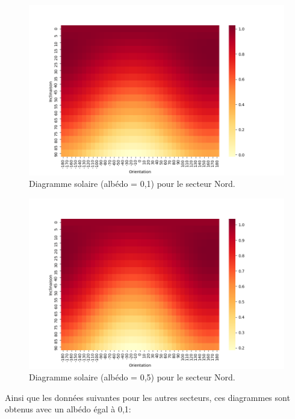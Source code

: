 \documentclass[12pt,a4paper,openright]{report}
\begin{document}
\begin{figure}[h!]
\begin{center}
\includegraphics[scale=0.6]{secteurNord}
\caption{Diagramme solaire (albédo = 0,1) pour le secteur Nord.}
\end{center}
\end{figure}

\begin{figure}[h!]
\begin{center}
\includegraphics[scale=0.6]{albedo0,5}
\caption{Diagramme solaire (albédo = 0,5) pour le secteur Nord.}
\end{center}
\end{figure}
\newpage

Ainsi que les données suivantes pour les autres secteurs, ces diagrammes sont obtenus avec un albédo égal à 0,1:
\end{document}
